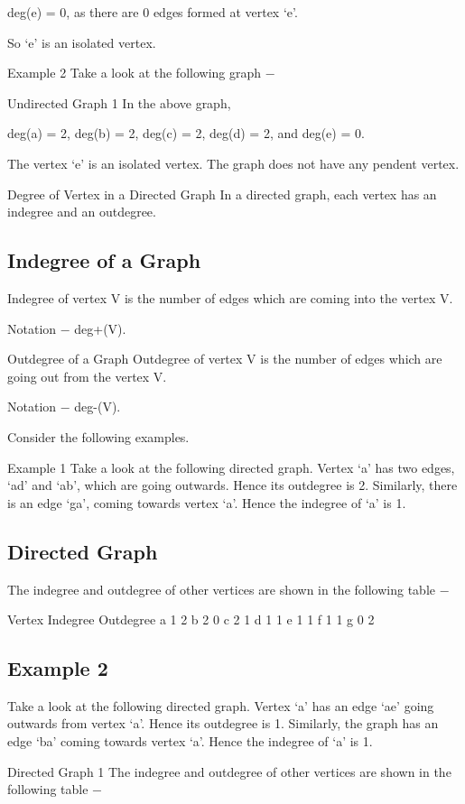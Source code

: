 deg(e) = 0, as there are 0 edges formed at vertex ‘e’.

So ‘e’ is an isolated vertex.

Example 2
Take a look at the following graph −

Undirected Graph 1
In the above graph,

deg(a) = 2, deg(b) = 2, deg(c) = 2, deg(d) = 2, and deg(e) = 0.

The vertex ‘e’ is an isolated vertex. The graph does not have any pendent vertex.

Degree of Vertex in a Directed Graph
In a directed graph, each vertex has an indegree and an outdegree.

\subsection{Indegree of a Graph}
Indegree of vertex V is the number of edges which are coming into the vertex V.

Notation − deg+(V).

Outdegree of a Graph
Outdegree of vertex V is the number of edges which are going out from the vertex V.

Notation − deg-(V).

Consider the following examples.

Example 1
Take a look at the following directed graph. Vertex ‘a’ has two edges, ‘ad’ and ‘ab’, which are going outwards. Hence its outdegree is 2. Similarly, there is an edge ‘ga’, coming towards vertex ‘a’. Hence the indegree of ‘a’ is 1.

\subsection{Directed Graph}
The indegree and outdegree of other vertices are shown in the following table −

Vertex	Indegree	Outdegree
a	1	2
b	2	0
c	2	1
d	1	1
e	1	1
f	1	1
g	0	2

\subsection{Example 2}
Take a look at the following directed graph. Vertex ‘a’ has an edge ‘ae’ going outwards from vertex ‘a’. Hence its outdegree is 1. Similarly, the graph has an edge ‘ba’ coming towards vertex ‘a’. Hence the indegree of ‘a’ is 1.

Directed Graph 1
The indegree and outdegree of other vertices are shown in the following table −

